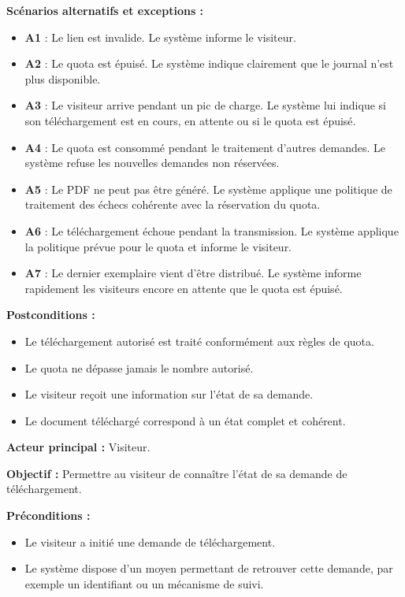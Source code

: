 \begin{description}[leftmargin=0pt, style=nextline, font=\normalfont\bfseries\color{violetprincipal}]
    \textbf{Scénarios alternatifs et exceptions :}
    \begin{itemize}
        \item \textbf{A1} : Le lien est invalide. Le système informe le visiteur.
        \item \textbf{A2} : Le quota est épuisé. Le système indique clairement que le journal n'est plus disponible.
        \item \textbf{A3} : Le visiteur arrive pendant un pic de charge. Le système lui indique si son téléchargement est en cours, en attente ou si le quota est épuisé.
        \item \textbf{A4} : Le quota est consommé pendant le traitement d'autres demandes. Le système refuse les nouvelles demandes non réservées.
        \item \textbf{A5} : Le PDF ne peut pas être généré. Le système applique une politique de traitement des échecs cohérente avec la réservation du quota.
        \item \textbf{A6} : Le téléchargement échoue pendant la transmission. Le système applique la politique prévue pour le quota et informe le visiteur.
        \item \textbf{A7} : Le dernier exemplaire vient d'être distribué. Le système informe rapidement les visiteurs encore en attente que le quota est épuisé.
    \end{itemize}

    \textbf{Postconditions :}
    \begin{itemize}
        \item Le téléchargement autorisé est traité conformément aux règles de quota.
        \item Le quota ne dépasse jamais le nombre autorisé.
        \item Le visiteur reçoit une information sur l'état de sa demande.
        \item Le document téléchargé correspond à un état complet et cohérent.
    \end{itemize}

    \item[UC09 --- Consulter l'état de la demande de téléchargement]

    \textbf{Acteur principal :} Visiteur.

    \textbf{Objectif :} Permettre au visiteur de connaître l'état de sa demande de téléchargement.

    \textbf{Préconditions :}
    \begin{itemize}
        \item Le visiteur a initié une demande de téléchargement.
        \item Le système dispose d'un moyen permettant de retrouver cette demande, par exemple un identifiant ou un mécanisme de suivi.
    \end{itemize}


\end{description}

